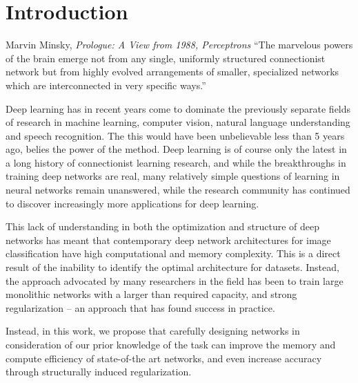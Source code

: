 \documentclass[thesis]{subfiles}
\begin{document}

\chapter{Introduction}  %

\begin{chapquote}{Marvin Minsky, \textit{Prologue: A View from 1988, Perceptrons}}
``The marvelous powers of the brain emerge not from any single, uniformly structured connectionist network but from highly evolved arrangements of smaller, specialized networks which are interconnected in very specific ways.''
\end{chapquote}

Deep learning has in recent years come to dominate the previously separate fields of research in machine learning, computer vision, natural language understanding and speech recognition. The this would have been unbelievable less than 5 years ago,  belies the power of the method. Deep learning is of course only the latest in a long history of connectionist learning research, and while the breakthroughs in training deep networks are real, many relatively simple questions of learning in neural networks remain unanswered, while the research community has continued to discover increasingly more applications for deep learning.

This lack of understanding in both the optimization and structure of deep networks has meant that contemporary deep network architectures for image classification have high computational and memory complexity. This is a direct result of the inability to identify the optimal architecture for datasets. Instead, the approach advocated by many researchers in the field has been to train large monolithic networks with a larger than required capacity, and strong regularization -- an approach that has found success in practice.

Instead, in this work, we propose that carefully designing networks in consideration of our prior knowledge of the task can improve the memory and compute efficiency of state-of-the art networks, and even increase accuracy through structurally induced regularization. 
\end{document}

